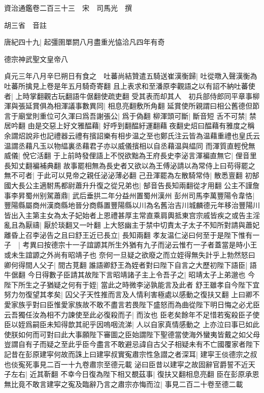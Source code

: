 資治通鑑卷二百三十三　宋　司馬光　撰

胡三省　音註

唐紀四十九|{
	起彊圉單閼八月盡重光恊洽凡四年有奇}


德宗神武聖文皇帝八

貞元三年八月辛巳朔日有食之　吐蕃尚結贊遣五騎送崔漢衡歸|{
	吐從暾入聲漢衡為吐蕃所擒見上卷是年五月騎奇寄翻}
且上表求和至潘原李觀語之以有詔不納吐蕃使者|{
	上時掌翻觀古玩翻語牛倨翻使疏吏翻}
受其表而却其人　初兵部侍郎同平章事柳渾與張延賞俱為相渾議事數異同|{
	相息亮翻敷所角翻}
延賞使所親謂曰相公舊德但節言于廟堂則重位可久渾曰爲吾謝張公|{
	爲于偽翻}
柳渾頭可斷|{
	斷音短}
舌不可禁|{
	禁居吟翻}
由是交惡上好文雅醖藉|{
	好呼到翻醖紆運翻藉夜翻史炤曰醖藉有雅度之稱余謂炤說非也記禮器云禮有擯詔樂有相步温之至也鄭氏注云皆為温藉重禮也皇氏云温謂丞藉凡玉以物緼裏丞藉君子亦以威儀擯相以自丞藉温與緼同}
而渾質直輕侻無威儀|{
	侻它活翻}
于上前時發俚語上不悦欲黜為王府長史李泌言渾褊直無它|{
	俚音里長知丈翻褊補典翻}
故事罷相無為長史者又欲以為王傅泌請以為常侍上曰苟得罷之無不可者|{
	于此可以見帝之親任泌泌薄必翻}
己丑渾罷為左散騎常侍|{
	散悉亶翻}
初郜國大長公主適駙馬都尉蕭升升復之從兄弟也|{
	郜音告長知兩翻從才用翻}
公主不謹詹事李昇蜀州别駕蕭鼎|{
	武后垂拱二年分益州置蜀州漢州}
彭州司馬李萬豐陽令韋恪|{
	豐陽縣屬商州漢商縣地晉分商縣置豐陽縣以川為名舊治吉川城麟德元年移治豐陽川}
皆出入主第主女為太子妃始者上恩禮甚厚主常直乘肩輿抵東宫宗戚皆疾之或告主淫亂且為厭禱|{
	厭於琰翻又一叶翻}
上大怒幽主于禁中切責太子太子不知所對請與蕭妃離昏上召李泌告之且曰舒王近已長立|{
	長知兩翻}
孝友温仁泌曰何至于是陛下惟有一子　|{
	考異曰按德宗十一子誼謜其所生外猶有九子而泌云惟冇一子者蓋當是時小王或未生誼謜之外尚有昭靖子也}
奈何一旦疑之欲廢之而立姪得無失計乎上勃然怒曰卿何得間人父子|{
	間古莧翻}
誰語卿舒王為姪者對曰陛下自言之大歷初陛下語臣|{
	語牛倨翻}
今日得數子臣請其故陛下言昭靖諸子主上令吾子之|{
	昭靖太子上弟邈也}
今陛下所生之子猶疑之何有于姪|{
	當此之時微李泌孰能言及此者}
舒王雖孝自今陛下宜努力勿復望其孝矣|{
	囚父子天性推而言及人情利害極處以感動之復扶又翻}
上曰卿不愛家族乎對曰臣惟愛家族故不敢不盡言若畏陛下盛怒而為曲從陛下明日悔之必尤臣云吾獨任汝為相不力諫使至此必復殺而子|{
	而汝也}
臣老矣餘年不足惜若寃殺臣子使臣以姪爲嗣臣未知得歆其祀乎因嗚咽流涕|{
	人以自家真情感動之}
上亦泣曰事已如此使朕如何而可對曰此大事願陛下審圖之臣始謂陛下聖德當使海外蠻夷皆戴之如父母豈謂自有子而疑之至此乎臣今盡言不敢避忌諱自古父子相疑未有不亡國覆家者陛下記昔在彭原建寜何故而誅上曰建寜叔實寃肅宗性急譛之者深耳|{
	建寜王倓德宗之叔也倓寃死事見二百一十九卷肅宗至德元載}
泌曰臣昔以建寜之故固辭官爵誓不近天子左右|{
	近其靳翻}
不幸今日復為陛下相又覩茲事|{
	復扶又翻相息亮翻}
臣在彭原承恩無比竟不敢言建寜之寃及臨辭乃言之肅宗亦悔而泣|{
	事見二百二十卷至德二載}

